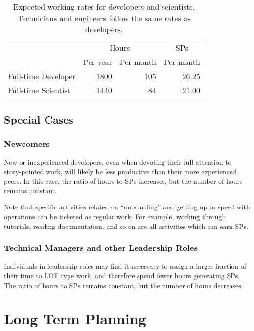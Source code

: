 \begin{table}
\begin{longtable}[]{@{}lrrr@{}}
\hline
          & \multicolumn{2}{c}{Hours} & \multicolumn{1}{c}{\glspl{SP}} \\
          & Per year & Per month      & Per month \\
\hline
Full-time Developer & 1800     & 105            & 26.25 \\
Full-time Scientist & 1440     &  84            & 21.00 \\
\hline
\end{longtable}
\caption{Expected working rates for developers and scientists. Technicians and engineers follow the same rates as developers.}
\label{tab:working-rate}
\end{table}

\subsection{Special Cases}

\subsubsection{Newcomers}
\label{sec:newcomers}

New or inexperienced developers, even when devoting their full attention to \gls{story}-pointed work, will likely be less productive than their more experienced peers.
In this case, the ratio of hours to \glspl{SP} increases, but the number of hours remains constant.

Note that specific activities related on ``onboarding'' and getting up to speed with operations can be ticketed as regular work.
For example, working through tutorials, reading documentation, and so on are all activities which can earn \glspl{SP}.

\subsubsection{Technical Managers and other Leadership Roles}

Individuals in leadership roles may find it necessary to assign a larger fraction of their time to \gls{LOE} type work, and therefore spend fewer hours generating \glspl{SP}.
The ratio of hours to \glspl{SP} remains constant, but the number of hours decreases.

\section{Long Term Planning}
\label{sec:long-term-plan}

